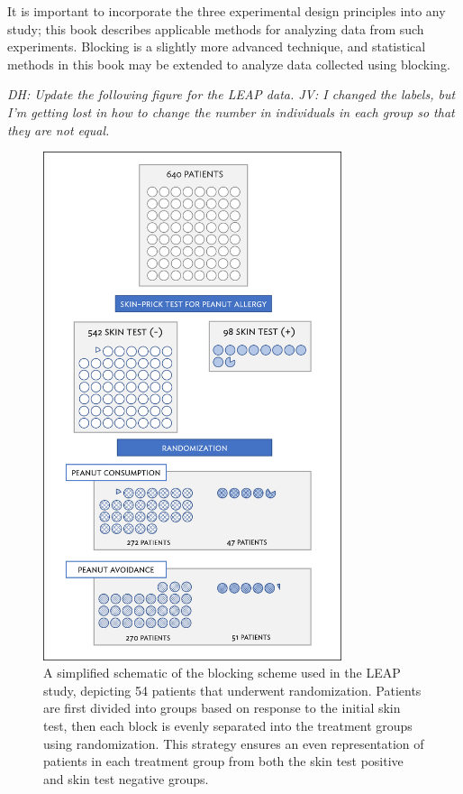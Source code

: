 \begin{doublespace}
\begin{description}
\end{description}

It is important to incorporate the three experimental design principles into any study; this book describes applicable methods for analyzing data from such experiments. Blocking is a slightly more advanced technique, and statistical methods in this book may be extended to analyze data collected using blocking.
	
\textit{DH: Update the following figure for the LEAP data. JV: I changed the labels, but I'm getting lost in how to change the number in individuals in each group so that they are not equal.}

	\begin{figure}
		\centering
		\includegraphics[width=0.78\textwidth]{ch_intro_to_data_oi_biostat/figures/leapBlocking/leap_blocking_draft.png}
		\caption{A simplified schematic of the blocking scheme used in the LEAP study, depicting 54 patients that underwent randomization. Patients are first divided into groups based on response to the initial skin test, then each block is evenly separated into the treatment groups using randomization. This strategy ensures an even representation of patients in each treatment group from both the skin test positive and skin test negative groups.}
		\label{leapBlocking}
	\end{figure}


\end{doublespace}
